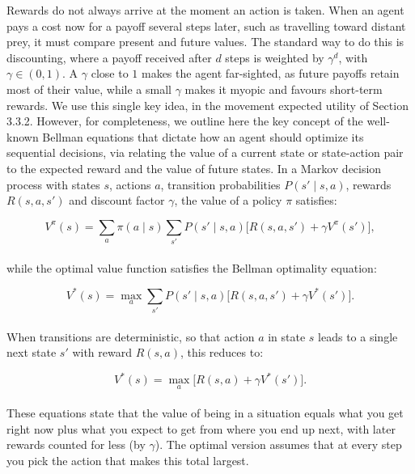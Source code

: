 \documentclass[12pt,a4paper]{report}
\begin{document}
	Rewards do not always arrive at the moment an action is taken. When an agent pays a cost now for a payoff several steps later, such as travelling toward distant prey, it must compare present and future values. The standard way to do this is discounting, where a payoff received after $d$ steps is weighted by $\gamma^{d}$, with $\gamma \in (0,1)$. A $\gamma$ close to $1$ makes the agent far-sighted, as future payoffs retain most of their value, while a small $\gamma$ makes it myopic and favours short-term rewards. We use this single key idea, in the movement expected utility of Section 3.3.2. However, for completeness, we outline here the key concept of the well-known Bellman equations \cite{Sutton2018} that dictate how an agent should optimize its sequential decisions, via relating the value of a current state or state-action pair to the expected reward and the value of future states. In a Markov decision process with states $s$, actions $a$, transition probabilities $P(s' \mid s, a)$, rewards $R(s,a,s')$ and discount factor $\gamma$, the value of a policy $\pi$ satisfies:
	
	\begin{equation}
	V^{\pi}(s) = \sum_{a} \pi(a \mid s) \sum_{s'} P(s' \mid s, a)\big[R(s,a,s') + \gamma V^{\pi}(s')\big],
	\end{equation} \\

	while the optimal value function satisfies the Bellman optimality equation:
	
	\begin{equation}
	V^{*}(s) = \max_{a} \sum_{s'} P(s' \mid s, a)\big[R(s,a,s') + \gamma V^{*}(s')\big].
	\end{equation} \\

	When transitions are deterministic, so that action $a$ in state $s$ leads to a single next state $s'$ with reward $R(s,a)$, this reduces to:
	
	\begin{equation}
	V^{*}(s) = \max_{a}\big[R(s,a) + \gamma V^{*}(s')\big].
	\end{equation} \\

	These equations state that the value of being in a situation equals what you get right now plus what you expect to get from where you end up next, with later rewards counted for less (by $\gamma$). The optimal version assumes that at every step you pick the action that makes this total largest.
\end{document}
